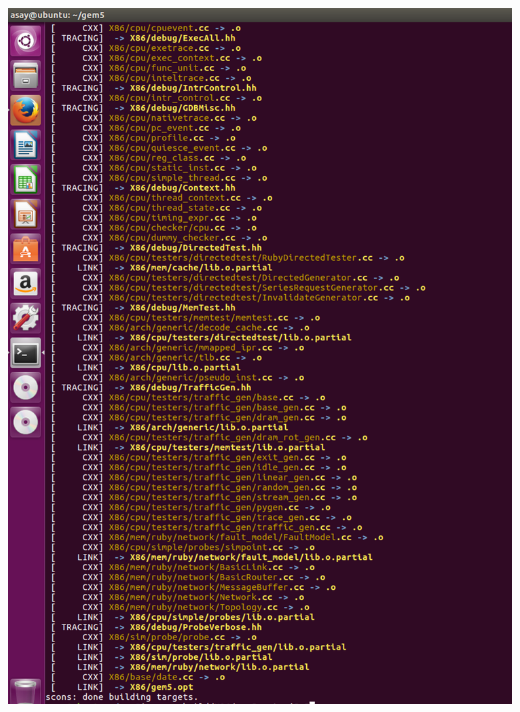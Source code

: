 \documentclass{article}
\begin{document}
\begin{center}
	\includegraphics[width=1\textwidth]{finalbuild}
\end{center}
\newpage
\end{document}
